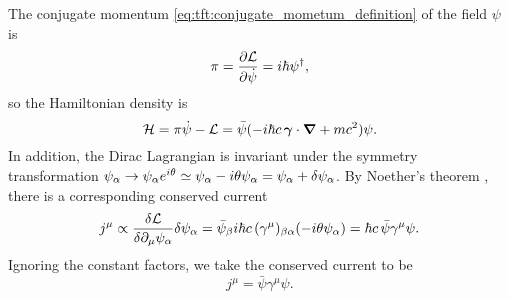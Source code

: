 The conjugate momentum \eqref{eq:tft:conjugate_mometum_definition} of the field $\psi$ is
\begin{equation}
	\pi = \pdv{\mathcal{L}}{\dot{\psi}} = i \hbar \psi^\dagger ,
\end{equation}
so the Hamiltonian density is
\begin{equation}
	\mathcal{H} = \pi \dot\psi - \mathcal{L} = \bar\psi ( -i \hbar c \, {\bm{\gamma}} \cdot {\bm{\nabla}} + m c^2 ) \psi .
\label{eq:tft:dirac_hamiltonian}
\end{equation}
In addition, the Dirac Lagrangian is invariant under the symmetry transformation $\psi_\alpha \rightarrow \psi_\alpha e^{i \theta} \simeq \psi_\alpha - i \theta \psi_\alpha = \psi_\alpha + \delta\psi_\alpha$.
By Noether's theorem \cite[equation 5.7]{ref:kachelriess}, there is a corresponding conserved current
\begin{equation}
	j^\mu \propto \fdv{\lagr}{\partial_\mu \psi_\alpha} \delta \psi_\alpha = \bar\psi_\beta i \hbar c \, (\gamma^\mu)_{\beta \alpha} (-i \theta \psi_\alpha) = \hbar c \, \bar\psi \gamma^\mu \psi .
\end{equation}
Ignoring the constant factors, we take the conserved current to be
\begin{equation}
	j^\mu = \bar\psi \gamma^\mu \psi .
\label{eq:tft:dirac_conserved_current}
\end{equation}

